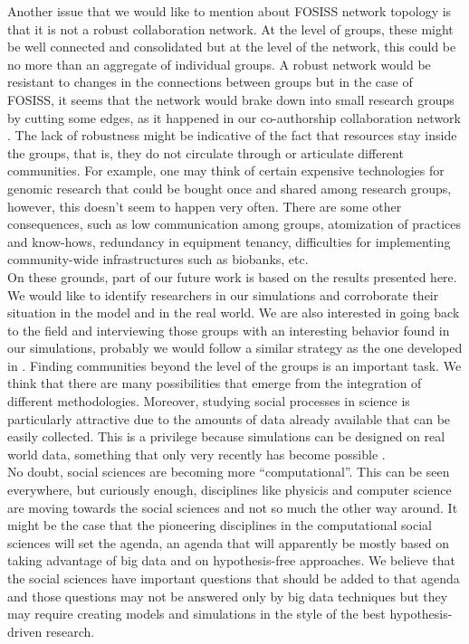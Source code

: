 \documentclass{bmcart}
\begin{document}
  Another issue that we would like to mention about FOSISS
  network topology is that it is not a robust collaboration network.
  At the level of groups, these might be well connected and
  consolidated but at the level of the network, this could be no more
  than an aggregate of individual groups. A robust network would be
  resistant to changes in the connections between groups but in the
  case of FOSISS, it seems that the network would brake down into
  small research groups by cutting some edges, as it happened in our
  co-authorship collaboration network \cite{HernandezLemus:2013}. The
  lack of robustness might be indicative of the fact that resources
  stay inside the groups, that is, they do not circulate through or
  articulate different communities. For example, one may think of
  certain expensive technologies for genomic research that could be
  bought once and shared among research groups, however, this doesn't
  seem to happen very often. There are some other consequences, such
  as low communication among groups, atomization of practices and
  know-hows, redundancy in equipment tenancy, difficulties for
  implementing community-wide infrastructures such as biobanks,
  etc. \\

On these grounds, part of our future work is based on
  the results presented here. We would like to identify researchers
  in our simulations and corroborate their situation in the model and
  in the real world. We are also interested in going back to the field
  and interviewing those groups with an interesting behavior found in
  our simulations, probably we would follow a similar strategy as the
  one developed in \cite{Hara:2003}. Finding communities beyond the
  level of the groups is an important task. We think that there are
  many possibilities that emerge from the integration of different
  methodologies. Moreover, studying social processes in science is
  particularly attractive due to the amounts of data already available
  that can be easily collected. This is a privilege because
  simulations can be designed on real world data, something that only
  very recently has become possible \cite{Barabasi:2012}.\\


No doubt, social sciences are becoming more ``computational''. This can
be seen everywhere, but curiously enough, disciplines like physicis
and computer science are moving towards the social
sciences and not so much the other way around. It might be the case
that the pioneering disciplines in the computational social sciences
will set the agenda, an agenda that will apparently be mostly based on
taking advantage of big data and on hypothesis-free approaches. We
believe that the social sciences have important questions that should
be added to that agenda and those questions may not be answered only
by big data techniques but they may require creating models and
simulations in the style of the best hypothesis-driven research.
\end{document}
